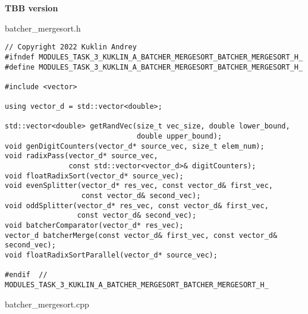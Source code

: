 \documentclass{report}
\begin{document}
\textbf{TBB version}
\par batcher\_mergesort.h
\begin{lstlisting}
// Copyright 2022 Kuklin Andrey
#ifndef MODULES_TASK_3_KUKLIN_A_BATCHER_MERGESORT_BATCHER_MERGESORT_H_
#define MODULES_TASK_3_KUKLIN_A_BATCHER_MERGESORT_BATCHER_MERGESORT_H_

#include <vector>

using vector_d = std::vector<double>;

std::vector<double> getRandVec(size_t vec_size, double lower_bound,
                               double upper_bound);
void genDigitCounters(vector_d* source_vec, size_t elem_num);
void radixPass(vector_d* source_vec,
               const std::vector<vector_d>& digitCounters);
void floatRadixSort(vector_d* source_vec);
void evenSplitter(vector_d* res_vec, const vector_d& first_vec,
                  const vector_d& second_vec);
void oddSplitter(vector_d* res_vec, const vector_d& first_vec,
                 const vector_d& second_vec);
void batcherComparator(vector_d* res_vec);
vector_d batcherMerge(const vector_d& first_vec, const vector_d& second_vec);
void floatRadixSortParallel(vector_d* source_vec);

#endif  // MODULES_TASK_3_KUKLIN_A_BATCHER_MERGESORT_BATCHER_MERGESORT_H_
\end{lstlisting}
\par batcher\_mergesort.cpp
\end{document}

